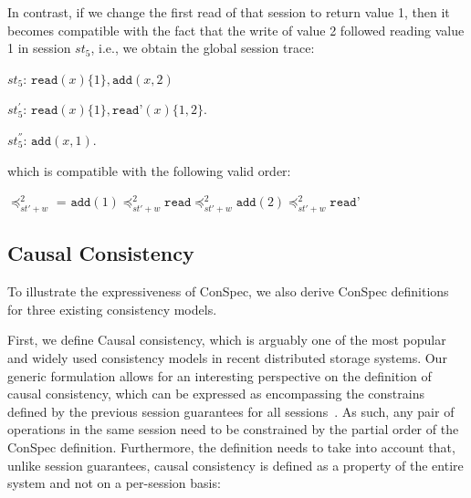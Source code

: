 \documentclass[journal,compsoc]{IEEEtran}
\begin{document}
In contrast, if we change the first read of that session to return  value 1, then it becomes compatible with the fact that the write of value 2 followed reading value 1 in session $\mathit{st}_5$, i.e., we obtain the global session trace:

 $\mathit{st}_5$: $\texttt{read}(x){\{1\}},\texttt{add}(x,2)$

$\mathit{st}_5^{'}$: $\texttt{read}(x){\{1\}},\texttt{read'}(x){\{1,2\}}$.

$\mathit{st}_5^{''}$: $\texttt{add}(x,1)$.

which is compatible with the following valid order:

  \noindent $\preccurlyeq_{\mathit{st'}+w}^2$ = $\texttt{add}(1) \preccurlyeq_{\mathit{st'}+w}^2 \texttt{read}
  \preccurlyeq_{\mathit{st'}+w}^2  \texttt{add}(2) \preccurlyeq_{\mathit{st'}+w}^2 \texttt{read'}$



\subsection{Causal Consistency}

To illustrate the expressiveness of ConSpec, we also derive ConSpec definitions for three existing consistency models.

First, we define Causal consistency, which is arguably one of the most popular and widely used consistency models in recent distributed storage systems. Our generic formulation allows for an interesting perspective on the definition of causal consistency, which can be expressed as encompassing the constrains defined by the previous session guarantees for all sessions~\cite{Ahamad:1993:PPC:165231.165264}. As such, any pair of operations in the same session need to be constrained by the partial order of the ConSpec definition. Furthermore, the definition needs to take into account that, unlike session guarantees, causal consistency is  defined as a property of the entire system and not on a per-session basis:
\end{document}
